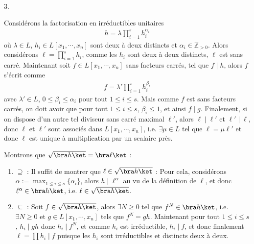 \documentclass[11pt]{article}
\begin{document}
    \begin{question}{3.}
        \label{q3}
        \item Considérons la factorisation en irréductibles unitaires
        \begin{align}
            h = \lambda \prod_{i = 1}^s h_i^{\alpha_i}
        \end{align}
        où $\lambda \in L$, $h_i \in L[x_1, \cdots, x_n]$ sont deux à deux distincts et $\alpha_i \in \mathbb{Z}_{>0}$. Alors considérons $\ell = \prod_{i = 1}^s h_i$, comme les $h_i$ sont deux à deux distincts, $\ell$ est sans carré. Maintenant soit $f \in L[x_1, \cdots, x_n]$ sans facteurs carrés, tel que $f \mid h$, alors $f$ s'écrit comme
        \begin{align*}
            f = \lambda' \prod_{i = 1}^s h_i^{\beta_i}
        \end{align*}
        avec $\lambda' \in L$, $0 \leq \beta_i \leq \alpha_i$ pour tout $1 \leq i \leq s$. Mais comme $f$ est sans facteurs carrés, on doit avoir que pour tout $1 \leq i \leq s$, $\beta_i \leq 1$, et ainsi $f \mid g$. Finalement, si on dispose d'un autre tel diviseur sans carré maximal $\ell'$, alors $\ell  \mid \ell '$ et $\ell ' \mid \ell $, donc $\ell $ et $\ell '$ sont associés dans $L[x_1, \cdots, x_n]$, i.e. $\exists \mu \in L$ tel que $\ell  = \mu \ell '$ et donc $\ell $ est unique à multiplication par un scalaire près.
        \item Montrons que $\sqrt{\bra h \ket} = \bra \ell \ket$ :
        \begin{enumerate}
            \item $\supseteq$ : Il suffit de montrer que $\ell \in \sqrt{\bra h \ket}$ : Pour cela, considérons $\alpha := \max_{1 \leq i \leq s} \{\alpha_i\}$, alors $h \mid \ell^\alpha$ au vu de la définition de $\ell$, et donc $\ell^\alpha \in \bra h \ket$, i.e. $\ell \in \sqrt{\bra h \ket}$.
            \item $\subseteq$ : Soit $f \in \sqrt{\bra h \ket}$, alors $\exists N \geq 0$ tel que $f^N \in \bra h \ket$, i.e. $\exists N \geq 0$ et $g \in L[x_1, \cdots, x_n]$ tels que $f^N = gh$. Maintenant pour tout $1 \leq i \leq s$, $h_i \mid gh$ donc $h_i \mid f^N$, et comme $h_i$ est irréductible, $h_i \mid f$, et donc finalement $\ell = \prod h_i \mid f$ puisque les $h_i$ sont irréductibles et distincts deux à deux.
        \end{enumerate}
    \end{question}
\end{document}
